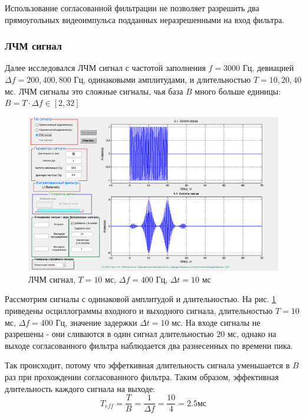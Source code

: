 Использование согласованной фильтрации не позволяет разрешить два прямоугольных видеоимпульса подданных неразрешенными на вход фильтра. 



\subsubsection{ЛЧМ сигнал}
Далее исследовался ЛЧМ сигнал с частотой заполнения $f=3000$ Гц, девиацией $\Delta f = 200, 400, 800$ Гц, одинаковыми амплитудами, и
длительностью $T=10, 20, 40$ мс. ЛЧМ сигналы это сложные сигналы, чья база $B$ много больше единицы: $B = T \cdot \Delta f \in [2,32]$
\begin{figure}[H]
    \centering
    \includegraphics[width=0.6\linewidth]{imgs/task5/lfm_dev400/t5s21_dur10_del10_dev400.png}
    \caption{ЛЧМ сигнал, $T=10$ мс, $\Delta f=400$ Гц, $\Delta t=10$ мс}
    \label{fig:t5s21_dur10_del10_dev400}
\end{figure}

Рассмотрим сигналы с одинаковой амплитудой и длительностью.
На рис. \ref{fig:t5s21_dur10_del10_dev400} приведены осциллограммы входного и выходного сигнала, длительностью
$T=10$ мс, $\Delta f=400$ Гц, значение задержки $\Delta t = 10$ мс. На входе сигналы не разрешены - они сливаются в один
сигнал длительностью 20 мс, однако на выходе согласованного фильтра наблюдается два разнесенных по времени пика.

Так происходит, потому  что эффеткивная длительность сигнала уменьшается в $B$ раз при прохождении согласованного фильтра. Таким образом,
эффективная длительность каждого сигнала на выходе:
\begin{equation}
    T_{eff} = \frac{T}{B} = \frac{1}{\Delta f}=\frac{10}{4} = 2.5 \text{мс}
    \label{eq:effective_dur}
\end{equation}

